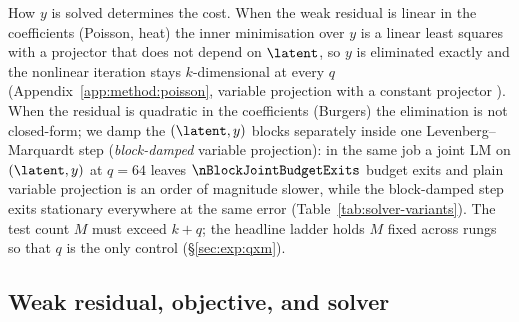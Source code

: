 How $y$ is solved determines the cost. When the weak residual is linear in the
coefficients (Poisson, heat) the inner minimisation over $y$ is a linear least
squares with a projector that does not depend on $\latent$, so $y$ is eliminated
exactly and the nonlinear iteration stays $k$-dimensional at every $q$
(Appendix~\ref{app:method:poisson}, variable projection with a constant
projector \citep{GolubPereyra1973}). When the residual is quadratic in the
coefficients (Burgers) the elimination is not closed-form; we damp the
$(\latent,y)$ blocks separately inside one Levenberg--Marquardt step
(\emph{block-damped} variable projection): in the same job a joint LM on
$(\latent,y)$ at $q=64$ leaves $\nBlockJointBudgetExits$ budget exits and plain
variable projection is an order of magnitude slower, while the block-damped
step exits stationary everywhere at the same error
(Table~\ref{tab:solver-variants}). The test count $M$ must exceed $k+q$; the headline ladder holds $M$
fixed across rungs so that $q$ is the only control (\S\ref{sec:exp:qxm}).

\subsection{Weak residual, objective, and solver}
\label{sec:method:weak}

